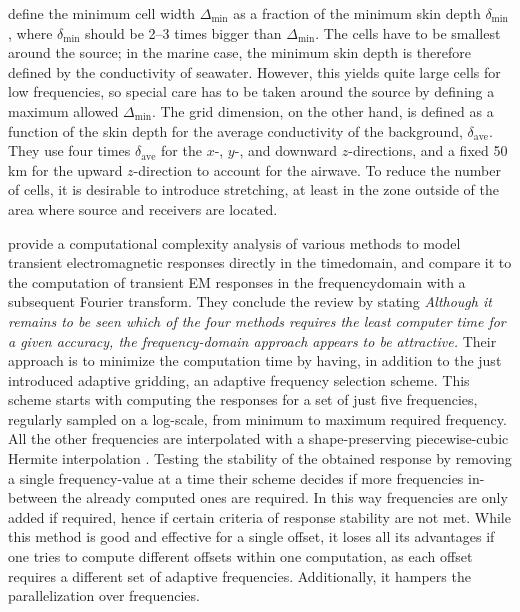 \documentclass[extra, camera,%
    final,       %
]{gji}
\begin{document}
\cite{GEO.07.Plessix} define the minimum cell width $\Delta_\mathrm{min}$ as a
fraction of the minimum skin depth $\delta_\mathrm{min}$, where
$\delta_\mathrm{min}$ should be 2--3 times bigger than $\Delta_\mathrm{min}$.
The cells have to be smallest around the source; in the marine case, the
minimum skin depth is therefore defined by the conductivity of seawater.
However, this yields quite large cells for low frequencies, so special care has
to be taken around the source by defining a maximum allowed
$\Delta_\mathrm{min}$. The grid dimension, on the other hand, is defined as a
function of the skin depth for the average conductivity of the background,
$\delta_\mathrm{ave}$. They use four times $\delta_\mathrm{ave}$ for the $x$-,
$y$-, and downward $z$-directions, and a fixed 50\,km for the upward
$z$-direction to account for the airwave. To reduce the number of cells, it is
desirable to introduce stretching, at least in the 
zone outside of the area where source and receivers are located.

\cite{GEO.08.Mulder} provide a computational complexity analysis of various
methods to model transient electromagnetic responses directly in the
time\replaced{ }{-}domain, and compare it to the computation of transient EM
responses in the frequency\replaced{ }{-}domain with a subsequent Fourier
transform. They conclude the review by stating \emph{\guillemotleft Although it
remains to be seen which of the four methods requires the least computer time
for a given accuracy, the frequency-domain approach appears to be
attractive.\guillemotright} Their approach is to minimize the computation time
by having, in addition to the just introduced adaptive gridding, an adaptive
frequency selection scheme. This scheme starts with computing the responses for
a set of just five frequencies, regularly sampled on a log-scale, from minimum
to maximum required frequency. All the other frequencies are interpolated with
a shape-preserving piecewise-cubic Hermite interpolation \citep[PCHIP,
][]{SIAM.80.Fritsch}. Testing the stability of the obtained response by
removing a single frequency-value at a time their scheme decides if more
frequencies in-between the already computed ones are required. In this way
frequencies are only added if required, hence if certain criteria of response
stability are not met. While this method is good and effective for a single
offset, it loses all its advantages if one tries to compute different offsets
within one computation, as each offset requires a different set of adaptive
frequencies. Additionally, it hampers the parallelization over frequencies.
\end{document}
